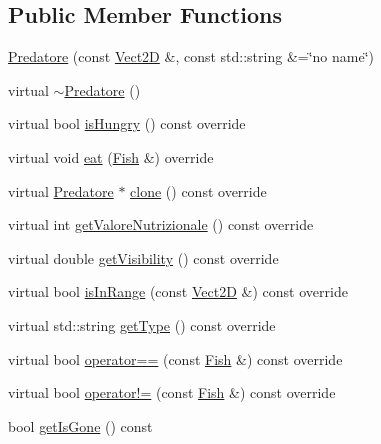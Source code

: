 \subsection*{Public Member Functions}
\begin{DoxyCompactItemize}
\item 
\hyperlink{classPredatore_a8aa157df9ce0145ebd9211e867d27258_a8aa157df9ce0145ebd9211e867d27258}{Predatore} (const \hyperlink{classVect2D}{Vect2D} \&, const std\+::string \&=\char`\"{}no name\char`\"{})
\item 
virtual \hyperlink{classPredatore_a72b2c3e53a30cd50693cfeb7c4e838ca_a72b2c3e53a30cd50693cfeb7c4e838ca}{$\sim$\+Predatore} ()
\item 
virtual bool \hyperlink{classPredatore_a5fee9e39cc20b5f9fe79aee870af852c_a5fee9e39cc20b5f9fe79aee870af852c}{is\+Hungry} () const override
\item 
virtual void \hyperlink{classPredatore_a67da3e1eb33a3e27014acc9195d72d08_a67da3e1eb33a3e27014acc9195d72d08}{eat} (\hyperlink{classFish}{Fish} \&) override
\item 
virtual \hyperlink{classPredatore}{Predatore} $\ast$ \hyperlink{classPredatore_a493b41e7df1542c10cdd646559514917_a493b41e7df1542c10cdd646559514917}{clone} () const override
\item 
virtual int \hyperlink{classPredatore_a9317be30d28ab61d3f7472f2b1183ba3_a9317be30d28ab61d3f7472f2b1183ba3}{get\+Valore\+Nutrizionale} () const override
\item 
virtual double \hyperlink{classPredatore_a1df89e4272f6cae88ffb445d12112a09_a1df89e4272f6cae88ffb445d12112a09}{get\+Visibility} () const override
\item 
virtual bool \hyperlink{classPredatore_ab7cd03e843432d25ba88348a9733a186_ab7cd03e843432d25ba88348a9733a186}{is\+In\+Range} (const \hyperlink{classVect2D}{Vect2D} \&) const override
\item 
virtual std\+::string \hyperlink{classPredatore_ae88add4104d54d5973b87d76f796a97c_ae88add4104d54d5973b87d76f796a97c}{get\+Type} () const override
\item 
virtual bool \hyperlink{classPredatore_a5633b0cdab96d56d7d0aca7f7b046ac6_a5633b0cdab96d56d7d0aca7f7b046ac6}{operator==} (const \hyperlink{classFish}{Fish} \&) const override
\item 
virtual bool \hyperlink{classPredatore_a26117f146fc2892877355788c5e5368e_a26117f146fc2892877355788c5e5368e}{operator!=} (const \hyperlink{classFish}{Fish} \&) const override
\item 
bool \hyperlink{classFish_a64e050916c0094ac377b8ec0d86a000b_a64e050916c0094ac377b8ec0d86a000b}{get\+Is\+Gone} () const

\end{DoxyCompactItemize}

